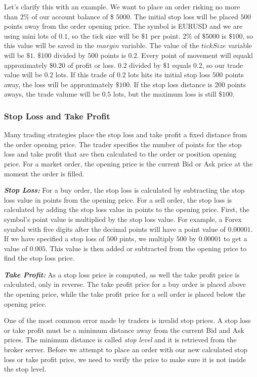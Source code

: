 Let's clarify this with an example. We want to place an order risking no more than $2\%$ of our account balance of \$ $5000$. The initial stop loss will be placed $500$ points away from the order opening price. The symbol is EURUSD and we are using mini lots of $0.1$, so the tick size will be $\$1$ per point. $2\%$ of $\$5000$ is $\$100$, so this value will be saved in the $margin$ variable. The value of the $tickSize$ variable will be $\$1$.
$\$100$ divided by $500$ points is $0.2$. Every point of movement will equakl approximately $\$0.20$ of profit or loss. $0.2$ divided by $\$1$ equals $0.2$, so our trade value will be $0.2$ lots. If this trade of $0.2$ lots hits its initial stop loss $500$ points away, the loss will be approximately $\$100$. If the stop loss distance is $200$ points aways, the trade valume will be $0.5$ lots, but the maximum loss is still $\$100$.

\subsubsection{Stop Loss and Take Profit}
Many trading strategies place the stop loss and take profit a fixed distance from the order opening price. The trader specifies the number of points for the stop loss and take profit that are then calculated to the order or position opening price. For a market order, the opening price is the current Bid or Ask price at the moment the order is filled.

\textit{\textbf{Stop Loss:}} For a buy order, the stop loss is calculated by subtracting the stop loss value in points from the opening price. For a sell order, the stop loss is calculated by adding the stop loss value in points to the opening price.
First, the symbol's point value is multiplied by the stop loss value. For example, a Forex symbol with five digits after the decimal points will have a point value of $0.00001$. If we have specified a stop loss of $500$ pints, we multiply $500$ by $0.00001$ to get a value of $0.005$. This value is then added or subtracted from the opening price to find the stop loss price.

\textit{\textbf{Take Profit:}} As a stop loss price is computed, as well the take profit price is calculated, only in reverse. The take profit price for a buy order is placed above the opening price, while the take profit price for a sell order is placed below the opening price.

One of the most common error made by traders is invalid stop prices. A stop loss or take profit must be a minimum distance away from the current Bid and Ask prices. The minimum distance is called \textit{stop level} and it is retrieved from the broker server. Before we attempt to place an order with our new calculated stop loss or take profit price, we need to verify the price to make sure it is not inside the stop level.

